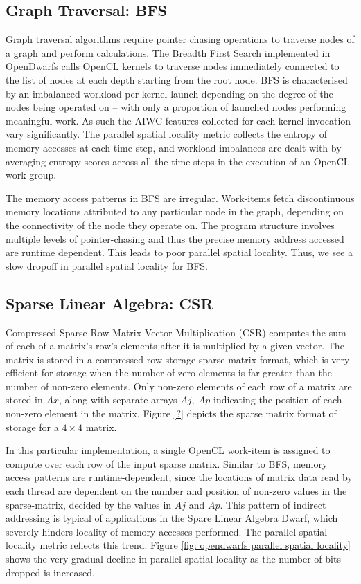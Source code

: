 \documentclass[review=false, sigchi]{acmart}
\begin{document}
	\subsection{Graph Traversal: BFS}
	
	Graph traversal algorithms require pointer chasing operations to traverse nodes of a graph and perform calculations. The Breadth First Search implemented in OpenDwarfs calls OpenCL kernels to traverse nodes immediately connected to the list of nodes at each depth starting from the root node. BFS is characterised by an imbalanced workload per kernel launch depending on the degree of the nodes being operated on -- with only a proportion of launched nodes performing meaningful work. As such the AIWC features collected for each kernel invocation vary significantly. The parallel spatial locality metric collects the entropy of memory accesses at each time step, and workload imbalances are dealt with by averaging entropy scores across all the time steps in the execution of an OpenCL work-group. 
	
	The memory access patterns in BFS are irregular. Work-items fetch discontinuous memory locations attributed to any particular node in the graph, depending on the connectivity of the node they operate on. The program structure involves multiple levels of pointer-chasing and thus the precise memory address accessed are runtime dependent. This leads to poor parallel spatial locality. Thus, we see a slow dropoff in parallel spatial locality for BFS.
	
	\subsection{Sparse Linear Algebra: CSR}
	
	Compressed Sparse Row Matrix-Vector Multiplication (CSR) computes the sum of each of a matrix's row's elements after it is multiplied by a given vector. The matrix is stored in a compressed row storage sparse matrix format, which is very efficient for storage when the number of zero elements is far greater than the number of non-zero elements. Only non-zero elements of each row of a matrix are stored in $Ax$, along with separate arrays $Aj,\ Ap$ indicating the position of each non-zero element in the matrix. Figure \ref{?} depicts the sparse matrix format of storage for a $4\times4$ matrix.
	
	In this particular implementation, a single OpenCL work-item is assigned to compute over each row of the input sparse matrix. Similar to BFS, memory access patterns are runtime-dependent, since the locations of matrix data read by each thread are dependent on the number and position of non-zero values in the sparse-matrix, decided by the values in $Aj$ and $Ap$. This pattern of indirect addressing is typical of applications in the Spare Linear Algebra Dwarf, which severely hinders locality of memory accesses performed. The parallel spatial locality metric reflects this trend. Figure \ref{fig: opendwarfs parallel spatial locality} shows the very gradual decline in parallel spatial locality as the number of bits dropped is increased.
	
\end{document}
